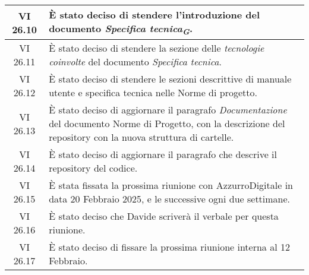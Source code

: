 \begin{table}[htbp]
\begin{tabular}{|c|p{}|}
        \hline
        VI 26.10 & È stato deciso di stendere l'introduzione  del documento \emph{Specifica tecnica}\textsubscript{\textit{\textbf{G}}}. \\
        \hline
        VI 26.11 & È stato deciso di stendere la sezione delle \emph{tecnologie coinvolte}  del documento \emph{Specifica tecnica}. \\
        \hline
        VI 26.12 & È stato deciso di stendere le sezioni descrittive di manuale utente e specifica tecnica nelle Norme di progetto. \\
        \hline
        VI 26.13 & È stato deciso di aggiornare il paragrafo \emph{Documentazione} del documento Norme di Progetto, con la descrizione del repository con la nuova struttura di cartelle. \\
        \hline
        VI 26.14 & È stato deciso di aggiornare il paragrafo che descrive il repository del codice. \\
        \hline
        VI 26.15 & È stata fissata la prossima riunione con AzzurroDigitale in data 20 Febbraio 2025, e le successive ogni due settimane. \\
        \hline
        VI 26.16 & È stato deciso che Davide scriverà il verbale per questa riunione. \\
        \hline
        VI 26.17 & È stato deciso di fissare la prossima riunione interna al 12 Febbraio. \\
        \hline
    \end{tabular}
\end{table}
